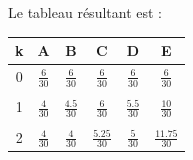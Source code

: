     Le tableau résultant est :
    \begin{center}
        \begin{tabular}{c|ccccc}
        k & A & B & C & D & E\\ \hline 
    	0 & $\frac{6}{30}$ & $\frac{6}{30}$ & $\frac{6}{30}$ & $\frac{6}{30}$ & $\frac{6}{30}$\\ \\
    	1 & $\frac{4}{30}$ & $\frac{4.5}{30}$ & $\frac{6}{30}$ & $\frac{5.5}{30}$ & $\frac{10}{30}$\\ \\
    	2 & $\frac{4}{30}$ & $\frac{4}{30}$ & $\frac{5.25}{30}$ & $\frac{5}{30}$ & $\frac{11.75}{30}$\\
    	\end{tabular}
    \end{center}


